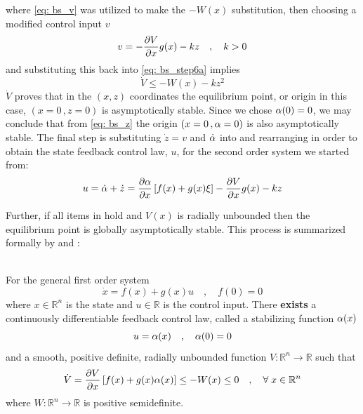 \documentclass[12pt]{ucthesis}
\begin{document}
where \autoref{eq: bs_v} was utilized to make the $-W(x)$ substitution, then choosing a modified control input $v$
	\begin{equation}
			v = -\frac{\partial V}{\partial x}g(x) - kz \quad,\quad k>0
		\label{eq: bs_step7}
	\end{equation}
and substituting this back into \autoref{eq: bs_step6a} implies
	\begin{equation}
			\dot{V} \leq -W(x) - kz^2
		\label{eq: bs_step6b}
	\end{equation}
%
\indent $\dot{V}$ proves that in the $(x,z)$ coordinates the equilibrium point, or origin in this case, $(x=0 \,, z=0)$ is asymptotically stable. Since we chose $\alpha(0)=0$, we may conclude that from \autoref{eq: bs_z} the origin $(x=0 \,, \alpha=0)$ is also asymptotically stable. The final step is substituting $\dot{z}=v$ and $\dot{\alpha}$ into  and rearranging in order to obtain the state feedback control law, $u$, for the second order system we started from:
	\begin{equation}
			u = \dot{\alpha} + \dot{z} = \frac{\partial\alpha}{\partial x}\left[ f(x)+g(x)\xi \right] - \frac{\partial V}{\partial x}g(x) - kz
		\label{eq: bs_step8}
	\end{equation}

Further, if all items in  hold and $V(x)$ is radially unbounded then the equilibrium point is globally asymptotically stable. This process is summarized formally by  and :

\begin{ass} \alignright \citet[Asmp. 2.7]{Krstic95} \label{ass: bs}\\
For the general first order system
	\begin{equation} 
		\dot{x} = f(x) + g(x)u \quad,\quad f(0)=0
		\label{eq: bs_ass_sys}
	\end{equation}
where $x \in \mathbb{R}^n$ is the state and $u \in \mathbb{R}$ is the control input. There \textbf{exists} a continuously differentiable feedback control law, called a stabilizing function $\alpha(x)$
	$$ u = \alpha(x) \quad,\quad \alpha(0)=0 $$
and a smooth, positive definite, radially unbounded function $V: \mathbb{R}^n \rightarrow \mathbb{R}$ such that
	$$ \dot{V} = \frac{\partial V}{\partial x}\left[ f(x) + g(x)\alpha(x) \right] \leq -W(x) \leq 0 \quad,\quad \forall\; x \in \mathbb{R}^n $$
where $W: \mathbb{R}^n \rightarrow \mathbb{R}$ is positive semidefinite.
\label{ass: backstepping2}
\end{ass}
\end{document}
